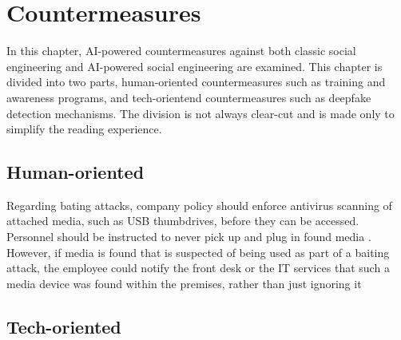 



\chapter{Countermeasures\label{countermeasures}}

In this chapter, AI-powered countermeasures against both classic social engineering and AI-powered social engineering are examined. This chapter is divided into two parts, human-oriented countermeasures such as training and awareness programs, and tech-orientend countermeasures such as deepfake detection mechanisms. The division is not always clear-cut and is made only to simplify the reading experience.


\section{Human-oriented}

Regarding bating attacks, company policy should enforce antivirus scanning of attached media, such as USB thumbdrives, before they can be accessed. Personnel should be instructed to never pick up and plug in found media \citep{salahdine_social_2019}. However, if media is found that is suspected of being used as part of a baiting attack, the employee could notify the front desk or the IT services that such a media device was found within the premises, rather than just ignoring it 

\section{Tech-oriented}

